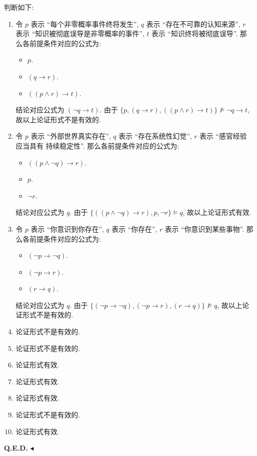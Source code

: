 \documentclass[11pt]{article}
\newenvironment{question}[2][Question]{\begin{trivlist}
    \item[\hskip \labelsep {\bfseries #1}\hskip \labelsep {\bfseries #2.}]\songti}{\hfill$\blacktriangleleft$\end{trivlist}}
\newcommand\1{\mathds{1}}
\newcommand{\ed}{\textbf{Q.E.D.}}
\begin{document}
\begin{question}{3 (40分)}
    判断如下:
    \begin{enumerate}
        \item 令 $p$ 表示 ``每个非零概率事件终将发生'', $q$ 表示 ``存在不可靠的认知来源'', $r$ 表示 ``知识被彻底误导是非零概率的事件'', $t$ 表示 ``知识终将被彻底误导''.
        那么各前提条件对应的公式为:
        \begin{itemize}
            \item $p$.
            \item $(q \to r)$.
            \item $((p \land r) \to t)$.
        \end{itemize}
        结论对应公式为 $(\lnot q \to t)$. 由于 $\{ p, (q \to r), ((p \land r) \to t) \} \not\models \lnot q \to t$, 故以上论证形式不是有效的.
        \item 令 $p$ 表示 ``外部世界真实存在'', $q$ 表示 ``存在系统性幻觉'', $r$ 表示 ``感官经验应当具有
        持续稳定性''. 那么各前提条件对应的公式为:
        \begin{itemize}
            \item $((p\land \lnot q) \to r)$.
            \item $p$.
            \item $\lnot r$.
        \end{itemize}
        结论对应公式为 $q$. 由于 $\{ ((p\land \lnot q) \to r), p, \lnot r \} \models q$, 故以上论证形式有效.
        \item 令 $p$ 表示 ``你意识到你存在'', $q$ 表示 ``你存在'', $r$ 表示 ``你意识到某些事物''. 那么各前提条件对应的公式为:
        \begin{itemize}
            \item $(\lnot p \to \lnot q)$.
            \item $(\lnot p \to r)$.
            \item $(r \to q)$.
        \end{itemize}
        结论对应公式为 $q$. 由于 $\{ (\lnot p \to \lnot q), (\lnot p \to r), (r \to q) \} \not\models q$, 故以上论证形式不是有效的.
        \item 论证形式不是有效的.
        \item 论证形式不是有效的.
        \item 论证形式有效.
        \item 论证形式有效.
        \item 论证形式有效.
        \item 论证形式不是有效的.
        \item 论证形式有效.
    \end{enumerate}
\ed
\end{question}
\end{document}
